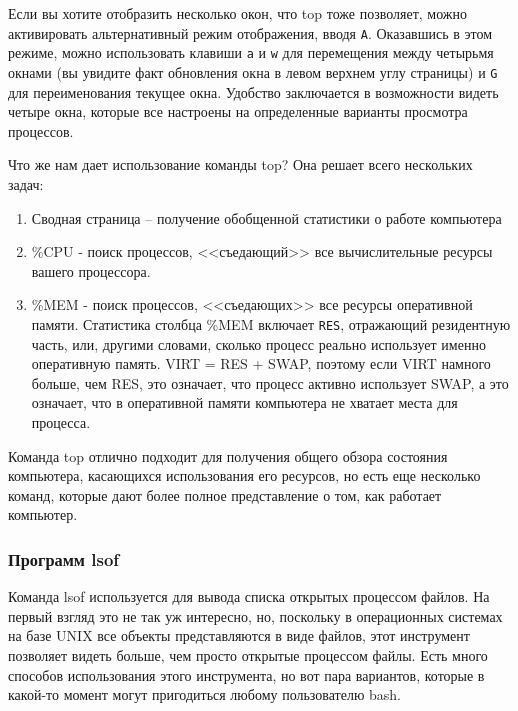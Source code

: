 \documentclass[12pt]{article}
\providecommand{\tightlist}{%
  \setlength{\itemsep}{0pt}\setlength{\parskip}{0pt}}
\begin{document}
Если вы хотите отобразить несколько окон, что top тоже позволяет, можно
активировать альтернативный режим отображения, вводя \texttt{A}.
Оказавшись в этом режиме, можно использовать клавиши \texttt{a} и
\texttt{w} для перемещения между четырьмя окнами (вы увидите факт
обновления окна в левом верхнем углу страницы) и \texttt{G} для
переименования текущее окна. Удобство заключается в возможности видеть
четыре окна, которые все настроены на определенные варианты просмотра
процессов.

Что же нам дает использование команды top? Она решает всего нескольких
задач:

\begin{enumerate}
\tightlist
\item
  Сводная страница -- получение обобщенной статистики о работе компьютера
\item
  \%CPU - поиск процессов, <<съедающий>> все вычислительные ресурсы вашего
  процессора.
\item
  \%MEM - поиск процессов, <<съедающих>> все ресурсы оперативной памяти.
  Статистика столбца \%MEM включает \texttt{RES}, отражающий резидентную
  часть, или, другими словами, сколько процесс реально использует
  именно оперативную память. VIRT = RES + SWAP, поэтому если VIRT
  намного больше, чем RES, это означает, что процесс активно использует
  SWAP, а это означает, что в оперативной памяти компьютера не хватает
  места для процесса.
\end{enumerate}

Команда top отлично подходит для получения общего обзора состояния
компьютера, касающихся использования его ресурсов, но есть еще несколько
команд, которые дают более полное представление о том, как работает
компьютер.

\hypertarget{lsof}{%
\subsubsection{\texorpdfstring{\protect\hyperlink{lsof}{}Программ
lsof}{Программ lsof}}\label{lsof}}

Команда lsof используется для вывода списка открытых процессом файлов.
На первый взгляд это не так уж интересно, но, поскольку в операционных
системах на базе UNIX все объекты представляются в виде файлов, этот
инструмент позволяет видеть больше, чем просто открытые процессом файлы.
Есть много способов использования этого инструмента, но вот пара
вариантов, которые в какой-то момент могут пригодиться любому
пользователю bash.
\end{document}
